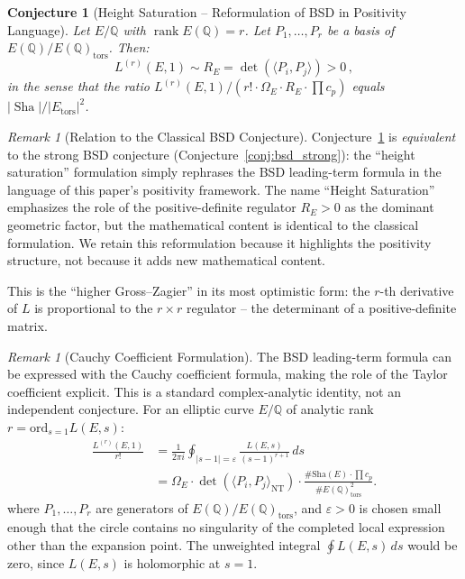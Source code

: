 \documentclass[aps,prd,twocolumn,superscriptaddress,nofootinbib,floatfix]{revtex4-2}
\newtheorem{conjecture}[theorem]{Conjecture}
\theoremstyle{definition}
\theoremstyle{remark}
\newtheorem{remark}[theorem]{Remark}
\DeclareMathOperator{\rank}{rank}
\DeclareMathOperator{\Sha}{Sha}
\begin{document}
\begin{conjecture}[Height Saturation -- Reformulation of BSD in Positivity Language]
\label{conj:height_saturation}
Let $E/\mathbb{Q}$ with $\rank E(\mathbb{Q}) = r$. Let $P_1, \ldots, P_r$ be a basis of $E(\mathbb{Q})/E(\mathbb{Q})_{\mathrm{tors}}$. Then:
\begin{equation}
L^{(r)}(E,1) \sim R_E = \det\!\left(\langle P_i, P_j \rangle\right) > 0\,,
\label{eq:height_saturation}
\end{equation}
in the sense that the ratio $L^{(r)}(E,1)/(r! \cdot \Omega_E \cdot R_E \cdot \prod c_p)$ equals $|\Sha|/|E_{\mathrm{tors}}|^2$.
\end{conjecture}

\begin{remark}[Relation to the Classical BSD Conjecture]
Conjecture~\ref{conj:height_saturation} is \textit{equivalent} to the strong BSD conjecture (Conjecture~\ref{conj:bsd_strong}): the ``height saturation'' formulation simply rephrases the BSD leading-term formula in the language of this paper's positivity framework. The name ``Height Saturation'' emphasizes the role of the positive-definite regulator $R_E > 0$ as the dominant geometric factor, but the mathematical content is identical to the classical formulation. We retain this reformulation because it highlights the positivity structure, not because it adds new mathematical content.
\end{remark}

This is the ``higher Gross--Zagier'' in its most optimistic form: the $r$-th derivative of $L$ is proportional to the $r \times r$ regulator -- the determinant of a positive-definite matrix.

\begin{remark}[Cauchy Coefficient Formulation]
\label{conj:height-saturation-identity}
The BSD leading-term formula can be expressed with the Cauchy coefficient formula, making the role of the Taylor coefficient explicit. This is a standard complex-analytic identity, not an independent conjecture. For an elliptic curve $E/\mathbb{Q}$ of analytic rank $r = \mathrm{ord}_{s=1} L(E,s)$:
\[
\begin{aligned}
\frac{L^{(r)}(E, 1)}{r!}
&= \frac{1}{2\pi i}
   \oint_{|s-1|=\varepsilon}
   \frac{L(E, s)}{(s-1)^{r+1}} \, ds \\
&= \Omega_E \cdot \det(\langle P_i, P_j \rangle_{\mathrm{NT}})
   \cdot \frac{\#\mathrm{Sha}(E) \cdot \prod c_p}
   {\#E(\mathbb{Q})_{\mathrm{tors}}^2}.
\end{aligned}
\]
where $P_1, \ldots, P_r$ are generators of $E(\mathbb{Q}) / E(\mathbb{Q})_{\mathrm{tors}}$, and $\varepsilon>0$ is chosen small enough that the circle contains no singularity of the completed local expression other than the expansion point. The unweighted integral $\oint L(E,s)\,ds$ would be zero, since $L(E,s)$ is holomorphic at $s=1$.
\end{remark}
\end{document}
